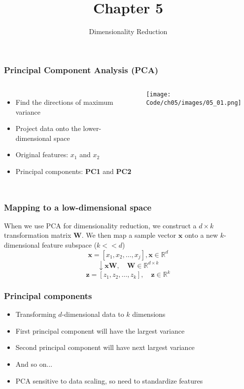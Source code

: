 \documentclass{beamer}
\title{Chapter 5}
\subtitle{Dimensionality Reduction}
\begin{document}
\maketitle

\begin{frame}
  \frametitle{Principal Component Analysis (PCA)}
  \begin{columns}[c]
    \begin{itemize}
    \item Find the directions of maximum variance
    \item Project data onto the lower-dimensional space
    \item Original features: $x_1$ and $x_2$
    \item Principal components: \textbf{PC1} and \textbf{PC2}
    \end{itemize}
    \texttt{[image: Code/ch05/images/05\_01.png]}
  \end{columns}
\end{frame}

\begin{frame}
  \frametitle{Mapping to a low-dimensional space}
  When we use PCA for dimensionality reduction, we construct a $d \times k$ transformation matrix $\mathbf{W}$.
  We then map a sample vector $\mathbf{x}$ onto a new $k$-dimensional feature subspace ($k << d$)
  \[
  \mathbf{x} = [ x_1, x_2, \dots, x_j], \mathbf{x} \in \mathbb{R}^d
  \]
  \[
  \downarrow \mathbf{x W}, \quad \mathbf{W} \in \mathbb{R}^{d \times k}
  \]
  \[
  \mathbf{z} = [z_1, z_2, \dots, z_k], \quad \mathbf{z} \in \mathbb{R}^k
  \]
\end{frame}

\begin{frame}
  \frametitle{Principal components}
  \begin{itemize}
  \item Transforming $d$-dimensional data to $k$ dimensions
  \item First principal component will have the largest variance
  \item Second principal component will have next largest variance
  \item And so on...
  \item PCA sensitive to data scaling, so need to standardize features
  \end{itemize}
\end{frame}
\end{document}
